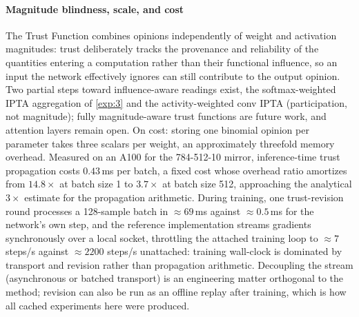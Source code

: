 \paragraph*{Magnitude blindness, scale, and cost}
The Trust Function combines opinions independently of weight and activation magnitudes: trust deliberately tracks the provenance and reliability of the quantities entering a computation rather than their functional influence, so an input the network effectively ignores can still contribute to the output opinion. Two partial steps toward influence-aware readings exist, the softmax-weighted IPTA aggregation of \cref{exp:3} and the activity-weighted conv IPTA (participation, not magnitude); fully magnitude-aware trust functions are future work, and attention layers remain open. On cost: storing one binomial opinion per parameter takes three scalars per weight, an approximately threefold memory overhead. Measured on an A100 for the 784-512-10 mirror, inference-time trust propagation costs $0.43$\,ms per batch, a fixed cost whose overhead ratio amortizes from $14.8\times$ at batch size 1 to $3.7\times$ at batch size 512, approaching the analytical $3\times$ estimate for the propagation arithmetic. During training, one trust-revision round processes a 128-sample batch in ${\approx}69$\,ms against ${\approx}0.5$\,ms for the network's own step, and the reference implementation streams gradients synchronously over a local socket, throttling the attached training loop to ${\approx}7$ steps/s against ${\approx}2200$ steps/s unattached: training wall-clock is dominated by transport and revision rather than propagation arithmetic. Decoupling the stream (asynchronous or batched transport) is an engineering matter orthogonal to the method; revision can also be run as an offline replay after training, which is how all cached experiments here were produced.

